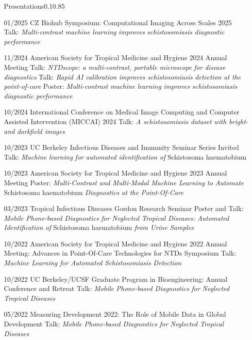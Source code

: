 \documentclass{federico_cv}
\begin{document}
\begin{tblSection}{Presentations}{0.1}{0.85}

\leftbfrightsingle
{01/2025}
{CZ Biohub Symposium: Computational Imaging Across Scales 2025}
{Talk: \textit{Multi-contrast machine learning improves schistosomiasis diagnostic performance}}

\leftbfrightsingle
{11/2024}
{American Society for Tropical Medicine and Hygiene 2024 Annual Meeting}
{Talk: \textit{NTDscope: a multi-contrast, portable microscope for disease diagnostics}}
{Talk: \textit{Rapid AI calibration improves schistosomiasis detection at the point-of-care}}
{Poster: \textit{Multi-contrast machine learning improves schistosomiasis diagnostic performance}}

\leftbfrightsingle
{10/2024}
{International Conference on Medical Image Computing and Computer Assisted Intervention (MICCAI) 2024}
{Talk: \textit{A schistosomiasis dataset with bright- and darkfield images}}

\leftbfrightsingle
{10/2023}
{UC Berkeley Infectious Diseases and Immunity Seminar Series}
{Invited Talk: \textit{Machine learning for automated identification of} Schistosoma haematobium}

\leftbfrightsingle
{10/2023}
{American Society for Tropical Medicine and Hygiene 2023 Annual Meeting}
{Poster: \textit{Multi-Contrast and Multi-Modal Machine Learning to Automate} Schistosoma haematobium \textit{Diagnostics at the Point-Of-Care}}

\leftbfrightsingle
{03/2023}
{Tropical Infectious Diseases Gordon Research Seminar}
{Poster and Talk: \textit{Mobile Phone-based Diagnostics for Neglected Tropical Diseases: Automated Identification of} Schistosoma haematobium \textit{from Urine Samples}}

\leftbfrightsingle
{10/2022}
{American Society for Tropical Medicine and Hygiene 2022 Annual Meeting: Advances in Point-Of-Care Technologies for NTDs Symposium}
{Talk: \textit{Machine Learning for Automated Schistosomiasis Detection}}

\leftbfrightsingle
{10/2022}
{UC Berkeley/UCSF Graduate Program in Bioengineering: Annual Conference and Retreat}
{Talk: \textit{Mobile Phone-based Diagnostics for Neglected Tropical Diseases}}

\leftbfrightsingle
{05/2022}
{Measuring Development 2022: The Role of Mobile Data in Global Development} %
{Talk: \textit{Mobile Phone-based Diagnostics for Neglected Tropical Diseases}}


\end{tblSection}
\end{document}

